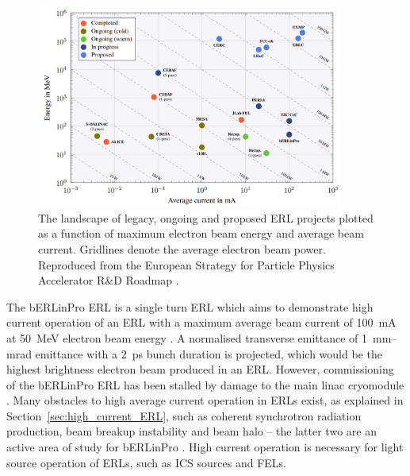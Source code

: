\documentclass[../main.tex]{subfiles}
\begin{document}
\begin{figure}[!h]
\centering
\includegraphics[width=0.9\textwidth]{Figures/CBETA_Multi-Pass_Commissioning/Tennant_ERL_Landscape.pdf}
\caption{The landscape of legacy, ongoing and proposed ERL projects plotted as a function of maximum electron beam energy and average beam current. Gridlines denote the average electron beam power. Reproduced from the European Strategy for Particle Physics
Accelerator R&D Roadmap \cite{adolphsen2022european}.}
\label{fig:ERL_Landscape}
\end{figure}

The bERLinPro ERL is a single turn ERL which aims to demonstrate high current operation of an ERL with a maximum average beam current of 100~\si{\milli\ampere} at 50~\si{\mega\electronvolt} electron beam energy \cite{kuske2012conceptual,neumann2018berlinpro}. A normalised transverse emittance of 1~\si{\milli\meter}--\si{\milli\radian} emittance with a 2~\si{\pico\second} bunch duration is projected, which would be the highest brightness electron beam produced in an ERL. However, commissioning of the bERLinPro ERL has been stalled by damage to the main linac cryomodule \cite{neumann2018berlinpro}. Many obstacles to high average current operation in ERLs exist, as explained in Section~\ref{sec:high_current_ERL}, such as coherent synchrotron radiation production, beam breakup instability and beam halo -- the latter two are an active area of study for bERLinPro \cite{neumann2012status,hwang2019first}. High current operation is necessary for light source operation of ERLs, such as ICS sources and FELs.  
\end{document}
